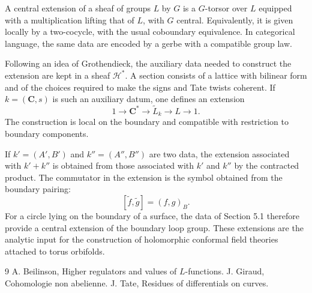 \documentclass[11pt]{article}
\theoremstyle{remark}
\newcommand{\C}{\mathbf C}
\begin{document}
A central extension of a sheaf of groups $L$ by $G$ is a $G$-torsor over $L$ equipped with a multiplication lifting that of $L$, with $G$ central. Equivalently, it is given locally by a two-cocycle, with the usual coboundary equivalence. In categorical language, the same data are encoded by a gerbe with a compatible group law.

Following an idea of Grothendieck, the auxiliary data needed to construct the extension are kept in a sheaf $\mathcal H^*$. A section consists of a lattice with bilinear form and of the choices required to make the signs and Tate twists coherent. If $k=(\C,s)$ is such an auxiliary datum, one defines an extension
\begin{equation}\tag{5.12.1}
 1\longrightarrow\C^*\longrightarrow\widetilde L_k\longrightarrow L\longrightarrow1.
\end{equation}
The construction is local on the boundary and compatible with restriction to boundary components.

If $k'= (A',B')$ and $k''=(A'',B'')$ are two data, the extension associated with $k'+k''$ is obtained from those associated with $k'$ and $k''$ by the contracted product. The commutator in the extension is the symbol obtained from the boundary pairing:
\begin{equation}\tag{5.16.1}
 [\tilde f,\tilde g]=(f,g)_B.
\end{equation}
For a circle lying on the boundary of a surface, the data of Section 5.1 therefore provide a central extension of the boundary loop group. These extensions are the analytic input for the construction of holomorphic conformal field theories attached to torus orbifolds.

\begin{thebibliography}{9}
 A. Beilinson, Higher regulators and values of $L$-functions.
 J. Giraud, Cohomologie non abelienne.
 J. Tate, Residues of differentials on curves.
\end{thebibliography}
\end{document}
